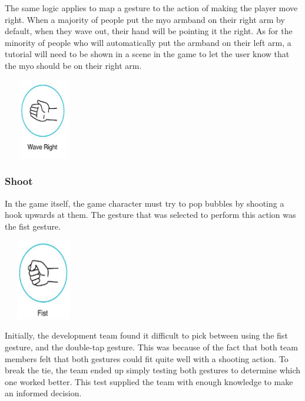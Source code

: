 \documentclass{article}
\begin{document}
The same logic applies to map a gesture to the action of making the player move right. When a majority of people put the myo armband on their right arm by default, when they wave out, their hand will be pointing it the right. As for the minority of people who will automatically put the armband on their left arm, a tutorial will need to be shown in a scene in the game to let the user know that the myo should be on their right arm.  

\bigskip

\includegraphics[width=100pt, height=100pt]{img/WaveRight.PNG}

\bigskip

\clearpage

\subsubsection{Shoot}
In the game itself, the game character must try to pop bubbles by shooting a hook upwards at them. The gesture that was selected to perform this action was the fist gesture.

\bigskip

\includegraphics[width=100pt, height=100pt]{img/Fist.PNG}

\bigskip

Initially, the development team found it difficult to pick between using the fist gesture, and the double-tap gesture. This was because of the fact that both team members felt that both gestures could fit quite well with a shooting action. 
To break the tie, the team ended up simply testing both gestures to determine which one worked better. This test supplied the team with enough knowledge to make an informed decision. 

\bigskip
\end{document}
